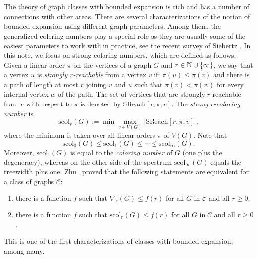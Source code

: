\documentclass[final]{dmtcs-episciences}
\theoremstyle{definition}
\theoremstyle{remark}
\newcommand{\scol}{\ensuremath{\mathrm{scol}}}
\newcommand{\sreach}{\ensuremath{\mathrm{SReach}}}
\renewcommand{\leq}{\leqslant}
\renewcommand{\geq}{\geqslant}
\DeclarePairedDelimiter\set{\{}{\}}
\begin{document}
The theory of graph classes with bounded expansion is rich and has a number of connections with other areas. 
There are several characterizations of the notion of bounded expansion using different graph parameters. 
Among them, the generalized coloring numbers play a special role as they are usually some of the easiest parameters to work with in practice, see the recent survey of Siebertz \cite{Sie25}.
In this note, we focus on strong coloring numbers, which are defined as follows. 
Given a linear order $\pi$ on the vertices of a graph $G$ and $r\in\mathbb{N}\cup\set{\infty}$, 
we say that a vertex $u$ is \emph{strongly $r$-reachable} from a vertex $v$ if: $\pi(u) \leq \pi(v)$ and there is a path of length at most $r$ joining $v$ and $u$ such that $\pi(v)< \pi(w)$ for every internal vertex $w$ of the path.
The set of vertices that are strongly $r$-reachable from $v$ with respect to $\pi$ is denoted by  $\sreach [r,\pi,v]$. 
The \emph{strong $r$-coloring number} is $$\scol_r(G):= \min_{\pi} \max_{v\in V(G)} |\sreach [r,\pi,v]|,$$
where the minimum is taken over all linear orders $\pi$ of $V(G)$.
Note that
\[\scol_0(G) \leq \scol_1(G) \leq \cdots \leq \scol_{\infty}(G).\]
Moreover, $\scol_1(G)$ is equal to the \emph{coloring number} of $G$ (one plus the degeneracy), whereas on the other side of the spectrum $\scol_{\infty}(G)$ equals the treewidth plus one. 
Zhu~\cite{Zhu09} proved that  the following statements are equivalent for a class of graphs $\mathcal{C}$:
\begin{enumerate}
\item[(i)] there is a function $f$ such that $\nabla_r(G)\leq f(r)$ for all $G$ in $\mathcal{C}$ and all $r\geq0$;
\item[(ii)] there is a function $f$ such that $\scol_r(G)\leq f(r)$ for all $G$ in $\mathcal{C}$ and all $r\geq0$.
\end{enumerate}
This is one of the first characterizations of classes with bounded expansion, among many.  


\smallskip
\end{document}
